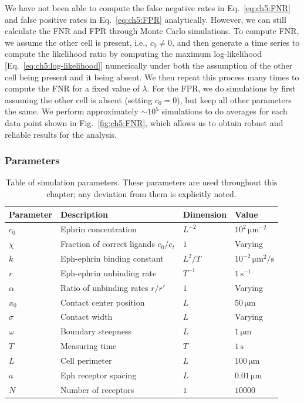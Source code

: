 We have not been able to compute the false negative rates in Eq.~\eqref{eq:ch5:FNR} and false positive rates in Eq.~\eqref{eq:ch5:FPR} analytically.
However, we can still calculate the FNR and FPR through Monte Carlo simulations.
To compute FNR, we assume the other cell is present, i.e., $c_0\neq 0$, and then generate a time series to compute the likelihood ratio by computing the maximum log-likelihood [Eq.~\eqref{eq:ch5:log-likelihood}] numerically under both the assumption of the other cell being present and it being absent.
We then repeat this process many times to compute the FNR for a fixed value of $\lambda$.
For the FPR, we do simulations by first assuming the other cell is absent (setting $c_0=0$), but keep all other parameters the same.
We perform approximately $\sim 10^5$ simulations to do averages for each data point shown in Fig.~\ref{fig:ch5:FNR}, which allows us to obtain robust and reliable results for the analysis.

\subsubsection{Parameters}


\begin{table}[t]
\centering
\caption[Default parameters of the CIL sensing model]{Table of simulation parameters. These parameters are used throughout this chapter; any deviation from them is explicitly noted.}
\label{tab:ch5:params}
\begin{tabular}{llll}
\toprule\toprule
Parameter & Description & Dimension & Value\\\midrule
$c_0$ & Ephrin concentration & $L^{-2}$ & $10^2\,\mathrm{\mu m}^{-2}$~\cite{xu2011epha2}\\
$\chi$ & Fraction of correct ligands $c_0/c_t$ & $1$ & Varying\\
$k$ & Eph-ephrin binding constant & $L^2/T$ & $10^{-2}\,\mathrm{\mu m^2/s}$\\
$r$ & Eph-ephrin unbinding rate & $T^{-1}$ & $1\,\mathrm{s}^{-1}$\\
$\alpha$ & Ratio of unbinding rates $r/r'$ & $1$ & Varying\\
$x_0$ & Contact center position & $L$ & $50\,\mathrm{\mu m}$ \\
$\sigma$ & Contact width & $L$ & Varying\\
$\omega$ & Boundary steepness & $L$ & $1\,\mathrm{\mu m}$\\
$T$ & Measuring time & $T$ & $1\,\mathrm{s}$\\
$L$ & Cell perimeter & $L$ & $100\,\mathrm{\mu m}$ \\
$a$ & Eph receptor spacing & $L$ & $0.01\,\mathrm{\mu m}$ \\
$N$ & Number of receptors & $1$ & $10000$\\
\bottomrule\bottomrule
\end{tabular}
\end{table}

